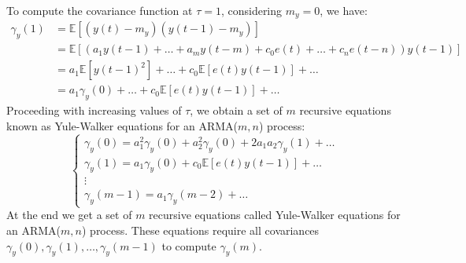 To compute the covariance function at $\tau=1$, considering $m_y=0$, we have:
\begin{align*}
    \gamma_y(1) &=\mathbb{E}\left[ \left(y(t)-m_y\right)\left(y(t-1)-m_y\right) \right] \\
                &=\mathbb{E}\left[ \left(a_1y(t-1)+\dots+a_m y(t-m)+c_0e(t)+\dots+c_n e(t-n)\right)y(t-1) \right] \\
                &=a_1\mathbb{E}\left[{y(t-1)}^2\right]+\dots+c_0\mathbb{E}\left[e(t)y(t-1)\right]+\dots \\
                &=a_1\gamma_y(0)+\dots+c_0\mathbb{E}\left[e(t)y(t-1)\right]+\dots
\end{align*}
Proceeding with increasing values of $\tau$, we obtain a set of $m$ recursive equations known as Yule-Walker equations for an ARMA($m,n$) process:
\[\begin{cases}
    \gamma_y(0)=a_1^2\gamma_y(0) +a_2^2\gamma_y(0) +2a_1a_2\gamma_y(1) +\dots \\
    \gamma_y(1)=a_1\gamma_y(0) +c_0\mathbb{E}\left[e(t)y(t-1)\right] +\dots \\
    \vdots \\
    \gamma_y(m-1)=a_1\gamma_y(m-2)+\dots
\end{cases}\]
At the end we get a set of $m$ recursive equations called Yule-Walker equations for an ARMA($m,n$) process.
These equations require all covariances $\gamma_y(0),\gamma_y(1),\dots,\gamma_y(m-1)$ to compute $\gamma_y(m)$.